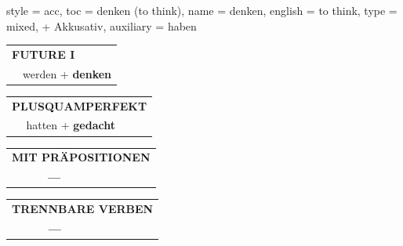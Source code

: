 \begin{verbentry}{
  style = {acc},
  toc = {denken (to think)},
  name = {denken},
  english = {to think},
  type = {mixed, + Akkusativ},
  auxiliary = {haben}
}
\begin{tabular}{rl}
    \multicolumn{2}{l}{\textbf{FUTURE I} }\\
  &  werden + \textbf{denken}\\
 
  \end{tabular}
\hfill
   \begin{tabular}{rl}
      \multicolumn{2}{l}{\textbf{PLUSQUAMPERFEKT}}\\
  &  hatten + \textbf{gedacht}\\
  \end{tabular}
  
  \vspace{10pt}

\begin{tabular}{lll}
\multicolumn{3}{l}{\textbf{MIT PRÄPOSITIONEN}}\\
& \textbf{---} & \\
\end{tabular}
\hfill
\begin{tabular}{lll}
\multicolumn{3}{l}{\textbf{TRENNBARE VERBEN}}\\
& \textbf{---} & \\
\end{tabular}

  \vspace{-5pt}
\end{verbentry}

